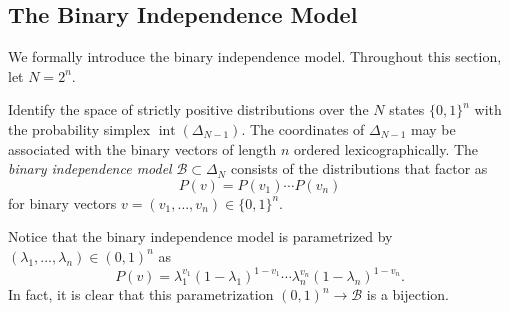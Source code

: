 \documentclass[11pt,titlepage]{article}
\newcommand*{\Bin}{\mathcal{B}}
\DeclareMathOperator{\intr}{int}
\numberwithin{equation}{section}
\begin{document}
\subsection{The Binary Independence Model}

    We formally introduce the binary independence model.  Throughout this
    section, let $N = 2^n$.
    \begin{definition}
    Identify the space of strictly positive distributions over the $N$ states
    $\{0,1\}^n$ with the probability simplex $\intr(\Delta_{N-1})$.  The
    coordinates of $\Delta_{N-1}$ may be associated with the binary vectors of
    length $n$ ordered lexicographically.  The \emph{binary independence model}
    $\Bin \subset \Delta_N$ consists of the distributions that factor as
    \[
        P(v) = P(v_1) \cdots P(v_n)
    \]
    for binary vectors $v = (v_1, \ldots, v_n) \in \{0,1\}^n$.
    \end{definition}

    Notice that the binary independence model is parametrized by $(\lambda_1,
    \ldots, \lambda_n) \in (0,1)^n$ as
    \begin{equation} \label{eq:bin}
        P(v) 
        = \lambda_1^{v_1}(1 - \lambda_1)^{1 - v_1}
        \cdots \lambda_n^{v_n}(1 - \lambda_n)^{1 - v_n}.
    \end{equation}
    In fact, it is clear that this parametrization $(0,1)^n \to \Bin$ is a
    bijection.
\end{document}
